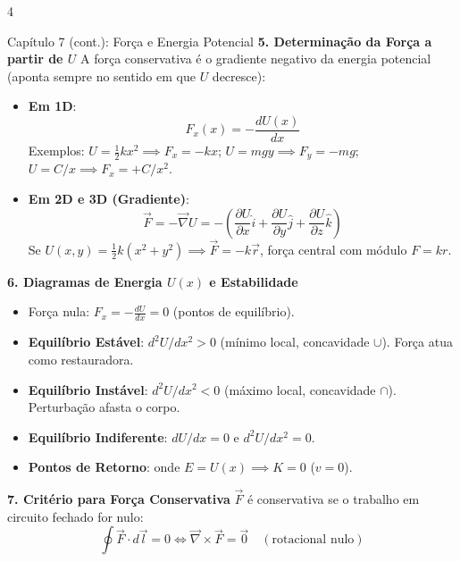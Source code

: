 \documentclass[9pt,a4paper,landscape]{extarticle}
\begin{document}
\begin{multicols*}{4}
\begin{topicbox}{Capítulo 7 (cont.): Força e Energia Potencial}
\textbf{5. Determinação da Força a partir de $U$}
A força conservativa é o gradiente negativo da energia potencial (aponta sempre no sentido em que $U$ decresce):
\begin{itemize}
    \item \textbf{Em 1D}:
    \begin{equation*}
        F_x(x) = -\frac{dU(x)}{dx}
    \end{equation*}
    Exemplos: $U = \frac{1}{2}kx^2 \implies F_x = -kx$; $U = mgy \implies F_y = -mg$; $U = C/x \implies F_x = +C/x^2$.
    \item \textbf{Em 2D e 3D (Gradiente)}:
    \begin{equation*}
        \vec{F} = -\vec{\nabla} U = -\left(\frac{\partial U}{\partial x}\hat{i} + \frac{\partial U}{\partial y}\hat{j} + \frac{\partial U}{\partial z}\hat{k}\right)
    \end{equation*}
    Se $U(x,y) = \frac{1}{2}k(x^2+y^2) \implies \vec{F} = -k\vec{r}$, força central com módulo $F = kr$.
\end{itemize}

\textbf{6. Diagramas de Energia $U(x)$ e Estabilidade}
\begin{itemize}
    \item Força nula: $F_x = -\frac{dU}{dx} = 0$ (pontos de equilíbrio).
    \item \textbf{Equilíbrio Estável}: $d^2U/dx^2 > 0$ (mínimo local, concavidade $\cup$). Força atua como restauradora.
    \item \textbf{Equilíbrio Instável}: $d^2U/dx^2 < 0$ (máximo local, concavidade $\cap$). Perturbação afasta o corpo.
    \item \textbf{Equilíbrio Indiferente}: $dU/dx = 0$ e $d^2U/dx^2 = 0$.
    \item \textbf{Pontos de Retorno}: onde $E = U(x) \implies K = 0$ ($v=0$).
\end{itemize}

\textbf{7. Critério para Força Conservativa}
$\vec{F}$ é conservativa se o trabalho em circuito fechado for nulo:
\begin{equation*}
    \oint \vec{F} \cdot d\vec{l} = 0 \iff \vec{\nabla} \times \vec{F} = \vec{0} \quad (\text{rotacional nulo})
\end{equation*}
\end{topicbox}

\end{multicols*}
\end{document}
